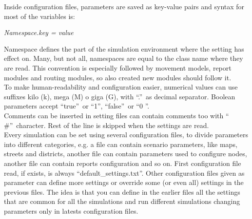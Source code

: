 
Inside configuration files, parameters are saved as key-value pairs and syntax for most of the
variables is:

\begin{center}
\textit{Namespace.key = value}
\end{center}

Namespace defines the part of the simulation environment where the setting has effect on. Many, but not all, namespaces are equal to the class name where they are read. This convention is especially followed by movement models, report modules and routing modules, so also created new modules should follow it.
\\

To make human-readability and configuration easier, numerical values can use suffixes kilo (k), mega (M) o giga (G), with \textquotedblleft .\textquotedblright \ as decimal separator. Boolean parameters accept \textquotedblleft true\textquotedblright \
 or \textquotedblleft 1\textquotedblright , \textquotedblleft false\textquotedblright \ or \textquotedblleft 0 \textquotedblright .
\\
 
Comments can be inserted in setting files can contain comments too with \textquotedblleft
\#\textquotedblright \ character. Rest of the line is skipped when the settings are read.
\\

Every simulation can be set using several configuration files, to divide parameters into different categories, e.g. a file can contain scenario parameters, like maps, streets and districts, another file can contain parameters used to configure nodes, another file can contain reports configuration and so on. First configuration file read, if exists, is always \textquotedblleft default\_settings.txt\textquotedblright. Other configuration files given as parameter can define more settings or override some (or even all) settings in the previous files. The idea is that you can define in the earlier files all the settings that are common for
all the simulations and run different simulations changing parameters only in latests configuration files.
\\


